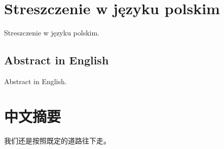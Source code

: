 \newpage
{}
\section*{Streszczenie w języku polskim}
  Streszczenie w języku polskim.
\newpage
\begin{otherlanguage}{english}
\section*{Abstract in English}
  Abstract in English.
\end{otherlanguage}
\newpage
\section*{中文摘要}
我们还是按照既定的道路往下走。
